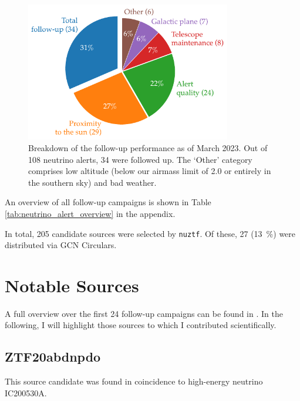\documentclass[
    a4paper, %
    fontsize=10pt, %
    twoside=true, %
    numbers=noenddot, %
    fontmethod=tex,
]{kaobook}
\begin{document}
\begin{figure}[h!]
    \includegraphics[width=0.8\textwidth]{fu/follow_up_overview.pdf}
    \caption[Follow-up performance]{Breakdown of the follow-up performance as of March 2023. Out of 108 neutrino alerts, 34 were followed up. The `Other' category comprises low altitude (below our airmass limit of 2.0 or entirely in the southern sky) and bad weather.}
\end{figure}

An overview of all follow-up campaigns is shown in Table \ref{tab:neutrino_alert_overview} in the appendix.

In total, 205 candidate sources were selected by \texttt{nuztf}. Of these, 27 (\SI{13}{\percent}) were distributed via GCN Circulars.

\section{Notable Sources}
A full overview over the first 24 follow-up campaigns can be found in . In the following, I will highlight those sources to which I contributed scientifically.

\subsection{ZTF20abdnpdo}
This source candidate was found in coincidence to high-energy neutrino IC200530A. 


\end{document}
